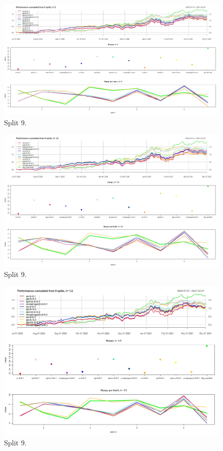 \documentclass[
]{article}
\begin{document}
\begin{figure}

{\centering \includegraphics[width=0.9\linewidth]{images/xailpd/lambda_2/all} 

}

\caption{Split 9.}\label{fig:all2}
\end{figure}

\begin{figure}

{\centering \includegraphics[width=0.9\linewidth]{images/xailpd/lambda_1_5_with0_5/all} 

}

\caption{Split 9.}\label{fig:all1_5_05}
\end{figure}

\begin{figure}

{\centering \includegraphics[width=0.9\linewidth]{images/xailpd/lambda_1_5/all} 

}

\caption{Split 9.}\label{fig:all1_5}
\end{figure}
\end{document}

